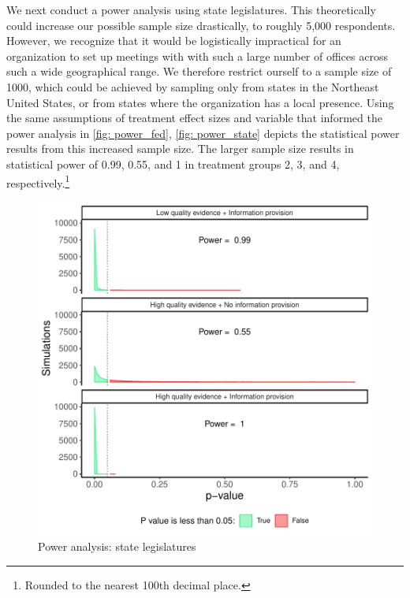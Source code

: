 \documentclass[12pt,final,fleqn]{article}
\theoremstyle{plain}
\begin{document}
We next conduct a power analysis using state legislatures. This theoretically could increase our possible sample size drastically, to roughly 5,000 respondents. However, we recognize that it would be logistically impractical for an organization to set up meetings with with such a large number of offices across such a wide geographical range. We therefore restrict ourself to a sample size of 1000, which could be achieved by sampling only from states in the Northeast United States, or from states where the organization has a local presence. Using the same assumptions of treatment effect sizes and variable that informed the power analysis in \autoref{fig: power_fed}, \autoref{fig: power_state} depicts the statistical power results from this increased sample size. The larger sample size results in statistical power of 0.99, 0.55, and 1 in treatment groups 2, 3, and 4, respectively.\footnote{Rounded to the nearest 100th decimal place.}

\begin{figure}[!htb]
\includegraphics{../figs/power_state.pdf}
\bigbreak
\caption{Power analysis: state legislatures}
\label{fig: power_state}
\end{figure}
\end{document}
